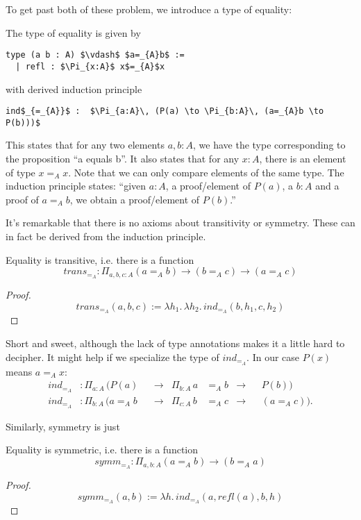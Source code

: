 \documentclass[a4paper, 12pt]{article}
\newcommand{\la}[1]{\lambda{#1}.\,}
\theoremstyle{changedot}
\theoremstyle{changedotbreak}
\theoremstyle{nonumberplain}
\newtheorem{proof}{Proof}
\begin{document}
To get past both of these problem, we introduce a type of equality:
\begin{definition}
  The type of equality is given by
\begin{lstlisting}[mathescape=true]
  type (a b : A) $\vdash$ $a=_{A}b$ :=
  | refl : $\Pi_{x:A}$ x$=_{A}$x
\end{lstlisting}
  with derived induction principle  
\begin{lstlisting}
ind$_{=_{A}}$ :  $\Pi_{a:A}\, (P(a) \to \Pi_{b:A}\, (a=_{A}b \to P(b)))$
\end{lstlisting}
\end{definition}

This states that for any two elements $a, b : A$, we have the type corresponding to the proposition ``a equals b''. It also states that for any $x : A$, there is an element of type $x=_{A}x$. Note that we can only compare elements of the same type. The induction principle states: ``given $a:A$, a proof/element of $P(a)$, a $b:A$ and a proof of $a=_{A}b$, we obtain a proof/element of $P(b)$.''

It's remarkable that there is no axioms about transitivity or symmetry. These can in fact be derived from the induction principle.
\begin{theorem}
  Equality is transitive, i.e. there is a function
  \[trans_{=_{A}} : \Pi_{a, b, c : A} (a=_{A}b) \to (b=_{A}c) \to (a=_{A}c) \]
\end{theorem}
\begin{proof}
  \[trans_{=_{A}}(a, b, c) := \la{h_{1}} \la{h_{2}} ind_{=_{A}}(b, h_{1}, c, h_{2})\]
\end{proof}
Short and sweet, although the lack of type annotations makes it a little hard to decipher. It might help if we specialize the type of $ind_{=_{A}}$. In our case $P(x)$ means $a=_{A}x$:
\begin{align*}
  ind_{=_{A}} &: \Pi_{a:A}\, (P(a)& &\to& \Pi_{b:A}\, a&=_{A}b &\to& &P(b)) \\
  ind_{=_{A}} &: \Pi_{b:A}\, (a=_{A}b& &\to& \Pi_{c:A}\, b&=_{A}c &\to& &(a=_{A}c)).
\end{align*}

Similarly, symmetry is just
\begin{theorem}
  Equality is symmetric, i.e. there is a function
  \[symm_{=_{A}} : \Pi_{a, b : A} (a =_{A} b) \to (b =_{A} a) \]
\end{theorem}
\begin{proof}
  \[symm_{=_{A}}(a, b) := \la h ind_{=_{A}}(a, refl(a), b, h)\]
\end{proof}
\end{document}
